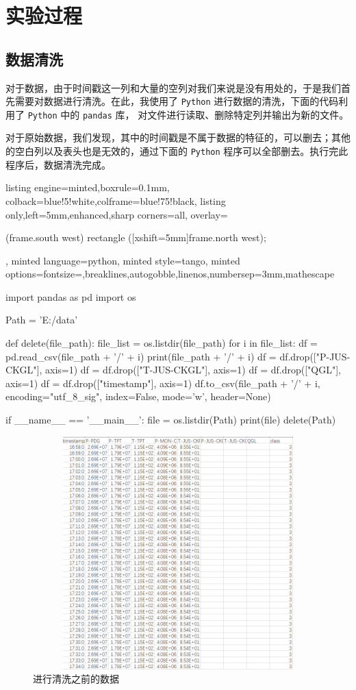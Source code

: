 \documentclass[a4paper, 11pt, cn]{elegantpaper}
\begin{document}
\section{实验过程}

\subsection{数据清洗}

对于数据，由于时间戳这一列和大量的空列对我们来说是没有用处的，于是我们首先需要对数据进行清洗。在此，我使用了 \texttt{Python} 进行数据的清洗，下面的代码利用了 \texttt{Python} 中的 \texttt{pandas} 库，
对文件进行读取、删除特定列并输出为新的文件。

对于原始数据，我们发现，其中的时间戳是不属于数据的特征的，可以删去；其他的空白列以及表头也是无效的，通过下面的 \texttt{Python} 程序可以全部删去。执行完此程序后，数据清洗完成。
\begin{tcblisting}{listing engine=minted,boxrule=0.1mm,
    colback=blue!5!white,colframe=blue!75!black,
    listing only,left=5mm,enhanced,sharp corners=all,
    overlay={\begin{tcbclipinterior} (frame.south west)
    rectangle ([xshift=5mm]frame.north west);\end{tcbclipinterior}},
    minted language=python,
    minted style=tango,
    minted options={fontsize=\small,breaklines,autogobble,linenos,numbersep=3mm,mathescape}}
import pandas as pd
import os

Path = 'E:/data'

def delete(file_path):
    file_list = os.listdir(file_path)
    for i in file_list:
        df = pd.read_csv(file_path + '/' + i)
        print(file_path + '/' + i)
        df = df.drop(["P-JUS-CKGL"], axis=1)
        df = df.drop(["T-JUS-CKGL"], axis=1)
        df = df.drop(["QGL"], axis=1)
        df = df.drop(["timestamp"], axis=1)
        df.to_csv(file_path + '/' + i, encoding="utf_8_sig", index=False, mode='w', header=None)

if __name__ == '__main__':
    file = os.listdir(Path)
    print(file)
    delete(Path)
\end{tcblisting}
\begin{figure}[htbp]
    \centering
    \includegraphics[height=9cm, width=12cm]{../resources/Before_Cleaning.png}
    \caption{进行清洗之前的数据}
\end{figure}
\end{document}
